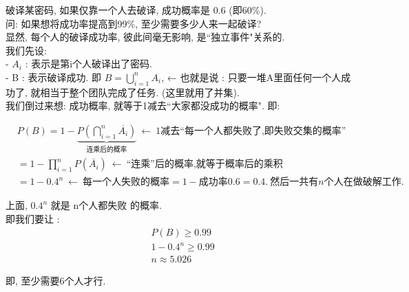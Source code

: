 \documentclass[UTF8]{ctexart}
\begin{document}
	
	\begin{myEnvSample}
		破译某密码, 如果仅靠一个人去破译, 成功概率是 0.6 (即60\%). \\
		问: 如果想将成功率提高到99\%, 至少需要多少人来一起破译? \\
		
		显然, 每个人的破译成功率, 彼此间毫无影响, 是``独立事件"关系的. \\
		我们先设: \\
		- $A_i$ : 表示是第i个人破译出了密码. \\
		- B : 表示破译成功. 即 $B=\bigcup_{i=1}^n{A_i}$, ← 也就是说 : 只要一堆A里面任何一个人成功了, 就相当于整个团队完成了任务. (这里就用了并集). \\
		
		我们倒过来想: 成功概率, 就等于1减去``大家都没成功的概率". 即: 
		
		\begin{align*}  %
			&P(B)=1-\underset{\text{连乘后的概率}}{\underbrace{P\left( \bigcap_{i=1}^n{\overline{A_i}} \right) }}\ ←\ 1\text{减去}\text{每一个人都失败了,即失败交集的概率}\\
			&=1-\prod_{i=1}^n{P\left( \overline{A_i} \right)}\ ←\ \text{连乘}\text{后的概率,就等于概率后的乘积}\\
			&=1-0.4^n\ ←\ \text{每一个人失败的概率}=1-\text{成功率}0.6=0.4.\ \text{然后一共有}n\text{个人在做破解工作}. 
		\end{align*}
		
		上面, $0.4^n$ 就是 n个人都失败 的概率. \\
		
		即我们要让 : 
		\begin{align*}  %
			&P\left( B \right) \ge 0.99\\
			&1-0.4^n\ge 0.99\\
			&n \approx 5.026  
		\end{align*}
		
		即, 至少需要6个人才行.
	\end{myEnvSample}
	
	
	
	
		
\end{document}
